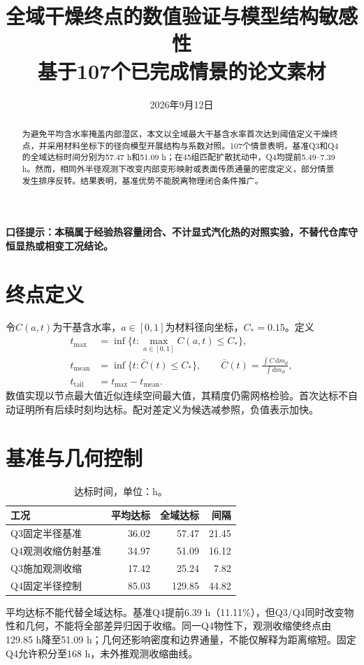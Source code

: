 \documentclass[UTF8,fontset=fandol,11pt,a4paper]{ctexart}
\title{全域干燥终点的数值验证与模型结构敏感性\\\large 基于107个已完成情景的论文素材}
\author{}
\date{2026年9月12日}
\begin{document}
\maketitle
\noindent\textbf{口径提示：本稿属于经验热容量闭合、不计显式汽化热的对照实验，不替代仓库守恒显热或相变工况结论。}

\begin{abstract}
为避免平均含水率掩盖内部湿区，本文以全域最大干基含水率首次达到阈值定义干燥终点，并采用材料坐标下的径向模型开展结构与系数对照。107个情景表明，基准Q3和Q4的全域达标时间分别为57.47 h和51.09 h；在45组匹配扩散扰动中，Q4均提前5.49--7.39 h。然而，相同外半径观测下改变内部变形映射或表面传质通量的密度定义，部分情景发生排序反转。结果表明，基准优势不能脱离物理闭合条件推广。
\end{abstract}
\section{终点定义}
令$C(a,t)$为干基含水率，$a\in[0,1]$为材料径向坐标，$C_*=0.15$。定义
\begin{align}
 t_{\max}&=\inf\{t:\max_{a\in[0,1]}C(a,t)\le C_*\},\\
 t_{\mathrm{mean}}&=\inf\{t:\bar C(t)\le C_*\},\qquad
 \bar C(t)=\frac{\int C\,\mathrm d m_d}{\int\mathrm d m_d},\\
 t_{\mathrm{tail}}&=t_{\max}-t_{\mathrm{mean}}.
\end{align}
数值实现以节点最大值近似连续空间最大值，其精度仍需网格检验。首次达标不自动证明所有后续时刻均达标。配对差定义为候选减参照，负值表示加快。
\section{基准与几何控制}
\begin{table}[htbp]\centering
\caption{达标时间，单位：h。}
\begin{tabular}{lrrr}\toprule
工况 & 平均达标 & 全域达标 & 间隔\\\midrule
Q3固定半径基准 &36.02&57.47&21.45\\
Q4观测收缩仿射基准 &34.97&51.09&16.12\\
Q3施加观测收缩 &17.42&25.24&7.82\\
Q4固定半径控制 &85.03&129.85&44.82\\\bottomrule
\end{tabular}\end{table}
平均达标不能代替全域达标。基准Q4提前6.39 h（11.11\%），但Q3/Q4同时改变物性和几何，不能将全部差异归因于收缩。同一Q4物性下，观测收缩使终点由129.85 h降至51.09 h；几何还影响密度和边界通量，不能仅解释为距离缩短。固定Q4允许积分至168 h，未外推观测收缩曲线。
\end{document}
